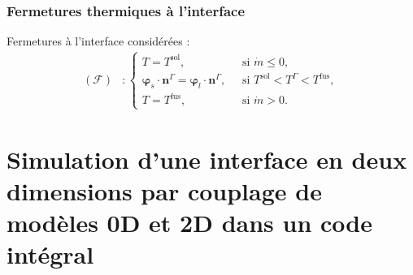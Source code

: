 \documentclass{beamer}
\newcommand{\inte}{\Gamma}
\newcommand{\fus}{\text{fus}}
\newcommand{\sol}{\text{sol}}
\newcommand{\vect}[1]{\bm{#1}}
\newcommand{\norm}{\vect{n}}
\begin{document}
\begin{frame}
\frametitle{Fermetures thermiques à l'interface}
\footnotesize


\begin{center}
		\begin{tikzpicture}[scale = 0.5, every node/.style={scale=0.5}]
			
		\end{tikzpicture}

\end{center}
\begin{ceablock}{Fermetures à l'interface considérées :}
\begin{align}
	(\mathcal{F}) &:\left\{ \begin{array}{ll}
T=T^\sol,  \; &\text{ si } \Dot{m} \leq 0, \\
\vect{\varphi}_s \cdot \norm^\inte= \vect{\varphi}_l \cdot \norm^\inte,  \; &\text{ si } T^\sol < T^\inte < T^\fus,\\
T=T^\fus,   \; &\text{ si } \Dot{m}>0.
 \end{array}\right.
\end{align}
\end{ceablock}
\end{frame}


\section{Simulation d'une interface en deux dimensions par couplage de modèles 0D et 2D dans un code intégral}
\end{document}
